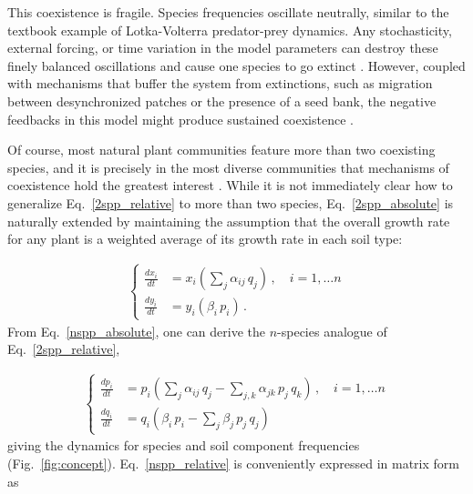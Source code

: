\documentclass[11pt]{article}
\begin{document}
This coexistence is fragile. Species frequencies oscillate neutrally, similar to the textbook example of Lotka-Volterra predator-prey dynamics. Any stochasticity, external forcing, or time variation in the model parameters can destroy these finely balanced oscillations and cause one species to go extinct \citep{revilla2013plant}. However, coupled with mechanisms that buffer the system from extinctions, such as migration between desynchronized patches or the presence of a seed bank, the negative feedbacks in this model might produce sustained coexistence \citep{revilla2013plant, bever2003soil}. 

Of course, most natural plant communities feature more than two coexisting species, and it is precisely in the most diverse communities that mechanisms of coexistence hold the greatest interest \citep{van2013plant}. While it is not immediately clear how to generalize Eq.~\ref{2spp_relative} to more than two species, Eq.~\ref{2spp_absolute} is naturally extended by maintaining the assumption that the overall growth rate for any plant is a weighted average of its growth rate in each soil type:

\begin{align} \label{nspp_absolute}
\begin{cases}
\frac{dx_i}{dt} &= x_i \left(\sum_{j} \alpha_{ij} \, q_j \right) \, , \quad  i = 1, \dots n \\
\frac{dy_i}{dt} &= y_i \left( \beta_i \, p_i \right) \, .
\end{cases}
\end{align}
From Eq.~\ref{nspp_absolute}, one can derive the $n$-species analogue of Eq.~\ref{2spp_relative},

\begin{align} \label{nspp_relative}
\begin{cases}
\frac{dp_i}{dt} &= p_i \left(\sum_{j} \alpha_{ij} \, q_j - \sum_{j, k} \alpha_{jk} \, p_j \, q_k \right) \, , \quad  i = 1, \dots n \\
\frac{dq_i}{dt} &= q_i \left(\beta_{i} \, p_i - \sum_{j} \beta_{j} \, p_j \, q_j  \right) \,
\end{cases}
\end{align}
giving the dynamics for species and soil component frequencies (Fig.~\ref{fig:concept}). Eq.~\ref{nspp_relative} is conveniently expressed in matrix form as
\end{document}
